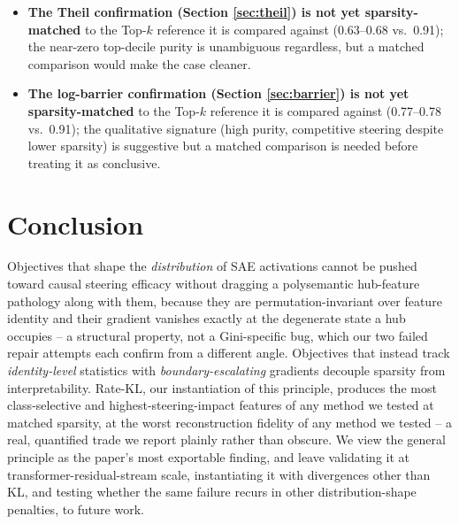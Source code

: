 \documentclass[11pt,twocolumn]{article}
\begin{document}
\begin{itemize}
\item \textbf{The Theil confirmation (Section \ref{sec:theil}) is not yet sparsity-matched} to the Top-$k$ reference it is compared against (0.63--0.68 vs.\ 0.91); the near-zero top-decile purity is unambiguous regardless, but a matched comparison would make the case cleaner.
\item \textbf{The log-barrier confirmation (Section \ref{sec:barrier}) is not yet sparsity-matched} to the Top-$k$ reference it is compared against (0.77--0.78 vs.\ 0.91); the qualitative signature (high purity, competitive steering despite lower sparsity) is suggestive but a matched comparison is needed before treating it as conclusive.
\end{itemize}

\section{Conclusion}
Objectives that shape the \emph{distribution} of SAE activations cannot be pushed toward causal steering efficacy without dragging a polysemantic hub-feature pathology along with them, because they are permutation-invariant over feature identity and their gradient vanishes exactly at the degenerate state a hub occupies -- a structural property, not a Gini-specific bug, which our two failed repair attempts each confirm from a different angle. Objectives that instead track \emph{identity-level} statistics with \emph{boundary-escalating} gradients decouple sparsity from interpretability. Rate-KL, our instantiation of this principle, produces the most class-selective and highest-steering-impact features of any method we tested at matched sparsity, at the worst reconstruction fidelity of any method we tested -- a real, quantified trade we report plainly rather than obscure. We view the general principle as the paper's most exportable finding, and leave validating it at transformer-residual-stream scale, instantiating it with divergences other than KL, and testing whether the same failure recurs in other distribution-shape penalties, to future work.
\end{document}
